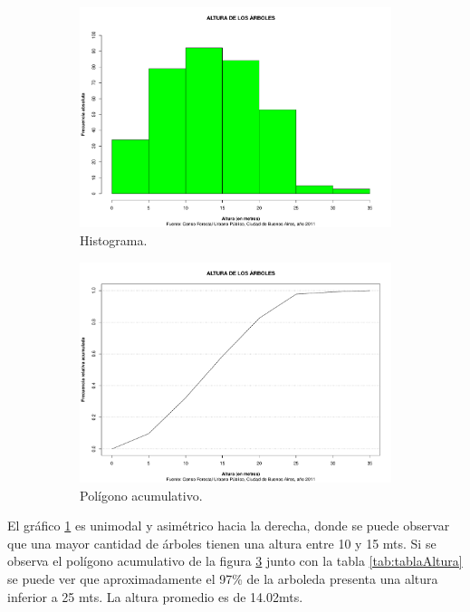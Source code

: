 \documentclass[11pt]{article}
\begin{document}
\begin{figure}[h!]
  \begin{center}
    \begin{subfigure}[b]{0.49\linewidth}
      \includegraphics[width=\linewidth]{histAltura.pdf}
      \caption{Histograma.}
      \label{fig:histAltura}
    \end{subfigure}
    \begin{subfigure}[b]{0.49\linewidth}
      \includegraphics[width=\linewidth]{acumAltura.pdf}
      \caption{Polígono acumulativo.}
      \label{fig:acumAltura}
    \end{subfigure}
  \caption{}
  \end{center}  
\end{figure}

\begin{justify}
  El gráfico \ref{fig:histAltura} es unimodal y asimétrico hacia la derecha,
  donde se puede observar
  que una mayor cantidad de árboles tienen una altura entre 10 y 15 mts.
  Si se observa el polígono acumulativo de la figura \ref{fig:acumAltura} 
  junto con la tabla \ref{tab:tablaAltura} se puede ver que aproximadamente
  el 97\% de la arboleda presenta una altura inferior a 25 mts.
  La altura promedio es de 14.02mts.
\end{justify}
\end{document}
